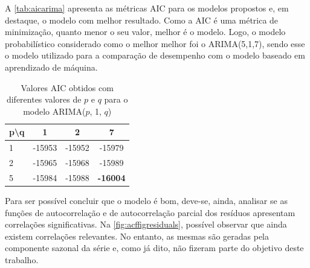 \documentclass[
    12pt,
    oneside,
    a4paper,
    english,
    brazil
]{abntex2}
\begin{document}
A \autoref{tab:aicarima} apresenta as métricas AIC para os modelos propostos e,
em  destaque, o  modelo com  melhor  resultado. Como a AIC é uma métrica de minimização, quanto menor o seu valor, melhor é o modelo. Logo,  o modelo  probabilístico considerado como o melhor melhor foi o ARIMA(5,1,7), sendo esse o modelo utilizado para a comparação de desempenho com o modelo baseado em aprendizado de máquina.

\begin{table}[ht]
\centering
    \caption{Valores AIC obtidos com diferentes valores de $p$ e $q$ para o modelo ARIMA($p$, 1, $q$)}\label{tab:aicarima}
\begin{tabular}{l c c c}
    p\textbackslash{}q  & 1      & 2      & 7               \\
    \toprule
    1                   & -15953 & -15952 & -15979          \\
    2                   & -15965 & -15968 & -15989          \\
    5                   & -15984 & -15988 & \textbf{-16004} \\
\end{tabular}
\end{table}

Para ser  possível concluir que o modelo é bom, deve-se, ainda, analisar se as
funções de autocorrelação e de autocorrelação parcial dos resíduos apresentam correlações significativas.  Na  \autoref{fig:acffigresiduals},
possível observar que  ainda existem correlações relevantes. No entanto, as mesmas são  geradas pela componente sazonal  da série  e, como  já dito, não fizeram parte  do objetivo deste trabalho.
\end{document}
